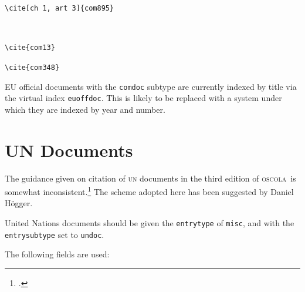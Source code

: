 \documentclass[a4paper,
               11pt,
	       DIV=1,			   
	       footinclude=false]
	      {scrartcl}
\newcommand{\oscolashort}{\textsc{oscola}\nocite{oscola}}
\newcommand{\egcite}[1]{{\texttt{\textbackslash cite#1}}}
\begin{document}
\begin{description}
\item[\egcite{[ch~1, art~3]\{com895\}}]\strut\\ \cite[ch~1, art~3]{com895}
\item[\egcite{\{com13\}}] \cite{com13}
\item[\egcite{\{com348\}}] \cite{com348}
\end{description}

EU official documents with the \texttt{comdoc} subtype are currently
indexed by title via the virtual index \texttt{euoffdoc}. This is
likely to be replaced with a system under which they are indexed by
year and number.

\section{UN Documents}

The guidance given on citation of \textsc{un} documents in the third edition of \oscolashort\ is
somewhat inconsistent.\footcite[See][32-36]{oscola3} The scheme adopted here has been suggested by Daniel H\"ogger.

United Nations documents should be given the \texttt{entrytype} of \texttt{misc}, and with the \texttt{entrysubtype} set to \texttt{undoc}.

The following fields are used:
\end{document}
